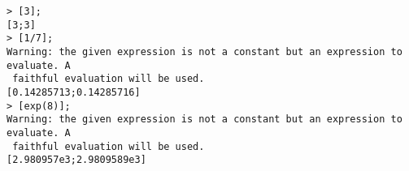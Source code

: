 \begin{center}\begin{minipage}{15cm}\begin{Verbatim}[frame=single]
> [3];
[3;3]
> [1/7];
Warning: the given expression is not a constant but an expression to evaluate. A
 faithful evaluation will be used.
[0.14285713;0.14285716]
> [exp(8)];
Warning: the given expression is not a constant but an expression to evaluate. A
 faithful evaluation will be used.
[2.980957e3;2.9809589e3]
\end{Verbatim}
\end{minipage}\end{center}
